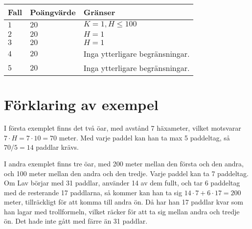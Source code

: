 \noindent
\begin{tabular}{| l | l | l |}
  \hline
  Fall & Poängvärde & Gränser \\ \hline
  $1$    & $20$        &  $K = 1, H \le 100$ \\ \hline 
  $2$    & $20$        &  $H = 1$ \\ \hline 
  $3$    & $20$        &  $H = 1$ \\ \hline 
  $4$    & $20$        &  Inga ytterligare begränsningar. \\ \hline
  $5$    & $20$        &  Inga ytterligare begränsningar. \\ \hline
\end{tabular}

\section*{Förklaring av exempel}

I första exemplet finns det två öar, med avstånd 7 häxameter, vilket motsvarar $7\cdot H = 7\cdot 10=70$ meter. Med varje paddel kan han ta max 5 paddeltag, så $70/5 = 14$ paddlar krävs.

I andra exemplet finns tre öar, med 200 meter mellan den första och den andra, och 100 meter mellan den andra och den tredje. Varje paddel kan ta 7 paddeltag. Om Lav börjar med 31 paddlar, använder 14 av dem fullt, och tar 6 paddeltag med de resterande 17 paddlarna, så kommer kan han ta sig $14\cdot 7+6\cdot 17=200$ meter, tillräckligt för att komma till andra ön. Då har han 17 paddlar kvar som han lagar med trollformeln, vilket räcker för att ta sig mellan andra och tredje ön. Det hade inte gått med färre än 31 paddlar.
